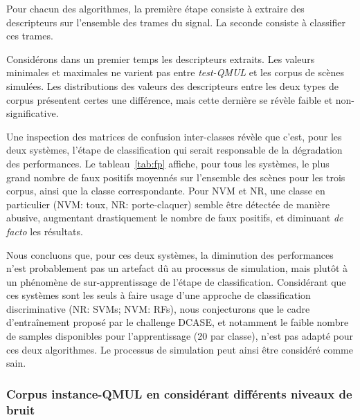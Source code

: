 Pour chacun des algorithmes, la première étape consiste à extraire des descripteurs sur l'ensemble des trames du signal. La seconde consiste à classifier ces trames.

Considérons dans un premier temps les descripteurs extraits. Les valeurs minimales et maximales ne varient pas entre \emph{test-QMUL} et les corpus de scènes simulées. Les distributions des valeurs des descripteurs entre les deux types de corpus présentent certes une différence, mais cette dernière se révèle faible et non-significative. 

Une inspection des matrices de confusion inter-classes révèle que c'est, pour les deux systèmes, l'étape de classification qui serait responsable de la dégradation des performances. Le tableau~\ref{tab:fp} affiche, pour tous les systèmes, le plus grand nombre de faux positifs moyennés sur l'ensemble des scènes pour les trois corpus, ainsi que la classe correspondante. Pour NVM et NR, une classe en particulier (NVM: toux, NR: porte-claquer) semble être détectée de manière abusive, augmentant drastiquement le nombre de faux positifs, et diminuant \emph{de facto} les résultats.

Nous concluons que, pour ces deux systèmes, la diminution des performances n'est probablement pas un artefact dû au processus de simulation, mais plutôt à un phénomène de sur-apprentissage de l'étape de classification. Considérant que ces systèmes sont les seuls à faire usage d'une approche de classification discriminative (NR: SVMs; NVM: RFs), nous conjecturons que le cadre d'entraînement proposé par le challenge DCASE, et notamment le faible nombre de samples disponibles pour l'apprentissage (20 par classe), n'est pas adapté pour ces deux algorithmes. Le processus de simulation peut ainsi être considéré comme sain.

\subsubsection{Corpus instance-QMUL en considérant différents niveaux de bruit}

